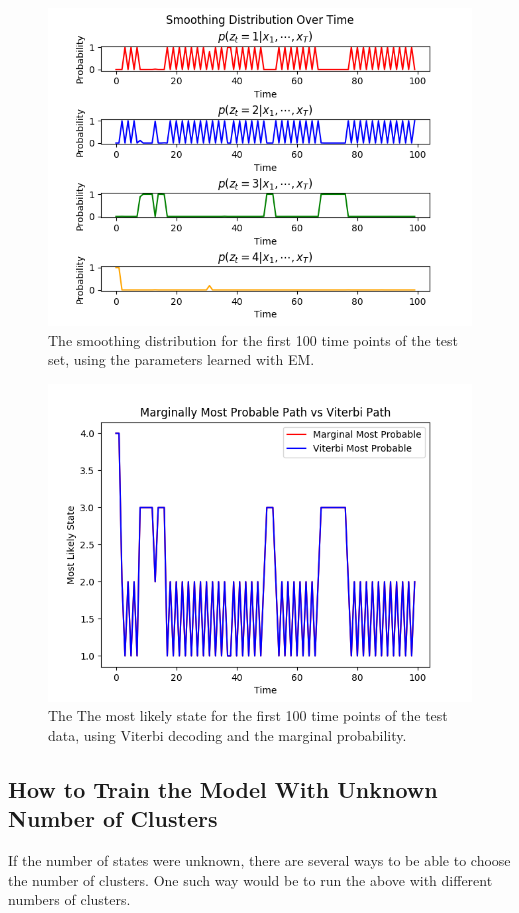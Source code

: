 \documentclass[paper=a4, fontsize=11pt]{scrartcl} %
\numberwithin{equation}{section} %
\numberwithin{figure}{section} %
\numberwithin{table}{section} %
\begin{document}
\begin{figure}
	\includegraphics[width=.9\linewidth]{smoothing_dist_EM.png}
	\caption{The smoothing distribution for the first 100 time points of the test set, using the parameters learned with EM.}
\end{figure}

\begin{figure}
	\includegraphics[width=.9\linewidth]{marg_vs_viterbi.png}
	\caption{The The most likely state for the first 100 time points of the test data, using Viterbi decoding and the marginal probability.}
\end{figure}

\subsection{How to Train the Model With Unknown Number of Clusters}
If the number of states were unknown, there are several ways to be able to choose the number of clusters. One such way would be to run the above with different numbers of clusters.
\end{document}
